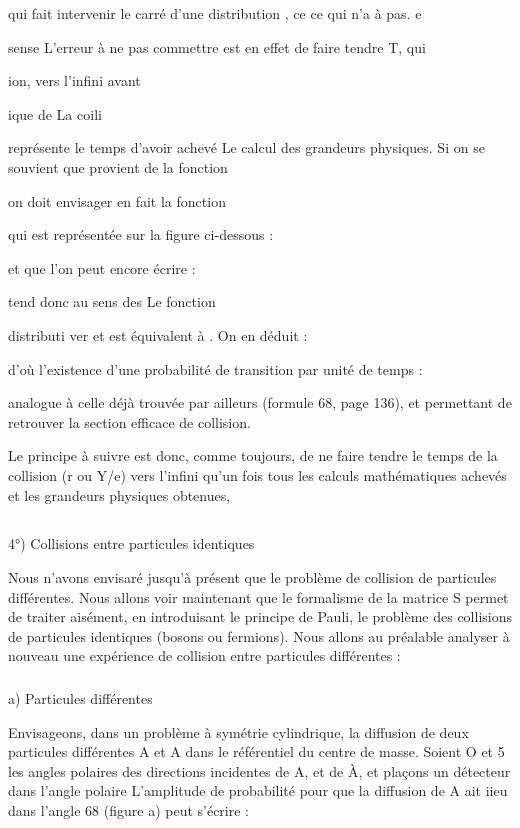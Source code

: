 qui fait intervenir le carré d'une distribution , ce ce qui n'a à pas. e

sense L'erreur à ne pas commettre est en effet de faire tendre T, qui

ion, vers l'infini avant

ique de La coili

représente le temps
d'avoir achevé Le calcul des grandeurs physiques.
Si on se souvient que  provient de la fonction

 on doit envisager en fait la fonction

qui est représentée sur la figure ci-dessous :


et que l'on peut encore écrire :

tend donc au sens des
Le fonction

distributi ver et est équivalent à .
On en déduit :

d'où l'existence d'une probabilité de transition par unité de
temps :

analogue à celle déjà trouvée par ailleurs (formule 68, page 136),
et permettant de retrouver la section efficace de collision.

Le principe à suivre est donc, comme toujours, de ne faire tendre
le temps de la collision (r ou Y/e) vers l'infini qu'un fois tous
les calculs mathématiques achevés et les grandeurs physiques obtenues,

\subsection{}%
4°) Collisions entre particules identiques

Nous n'avons envisaré jusqu'à présent que le problème de
collision de particules différentes. Nous allons voir maintenant
que le formalisme de la matrice S permet de traiter aisément, en introduisant le
principe de Pauli, le problème des collisions de particules identiques (bosons ou
fermions). Nous allons au préalable
analyser à nouveau une expérience de collision entre particules différentes :
\subsubsection{}%
a) Particules différentes

Envisageons, dans un problème à symétrie cylindrique, la diffusion de deux
particules différentes A et A dans le référentiel
du centre de masse. Soient O et 5 les angles polaires des directions
incidentes de A, et de À, et plaçons un détecteur dans l'angle polaire 
L'amplitude de probabilité pour que la diffusion de A ait iieu dans l'angle 68
(figure a) peut s'écrire :

